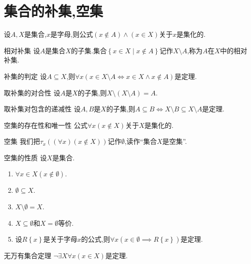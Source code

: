 \section{集合的补集,空集}

\begin{lemma}{}{}
	设$A,X$是集合,$x$是字母,则公式$\left(x\notin A\right)\wedge\left(x\in X\right)$关于$x$是集化的.
\end{lemma}

\begin{definition}{相对补集}{}
	设$A$是集合$X$的子集.集合$\left\{x\in X\middle|x\notin A\right\}$记作$X\setminus A$,称为$A$在$X$中的相对补集.
\end{definition}

\begin{proposition}{补集的判定}{}
	设$A\subseteq X$,则$\forall x\left(x\in X\setminus A\iff x\in X\wedge x\notin A\right)$是定理.
\end{proposition}

\begin{proposition}{取补集的对合性}{}
	设$A$是$X$的子集,则$X\setminus\left(X\setminus A\right)=A$.
\end{proposition}

\begin{proposition}{取补集对包含的递减性}{}
	设$A,B$是$X$的子集,则$A\subseteq B\iff X\setminus B\subseteq X\setminus A$是定理.
\end{proposition}

\begin{theorem}{空集的存在性和唯一性}{}
	公式$\forall x\left(x\notin X\right)$关于$X$是集化的.
\end{theorem}

\begin{definition}{空集}{}
	我们把$\tau_{x}\left(\left(\forall x\right)\left(x\notin X\right)\right)$记作$\emptyset$,读作``集合$X$是空集''.
\end{definition}

\begin{theorem}{空集的性质}{}
	设$X$是集合.
	\begin{enumerate}
		\item $\forall x\in X\left(x\notin\emptyset\right)$.
		\item $\emptyset\subseteq X$.
		\item $X\setminus\emptyset=X$.
		\item $X\subseteq\emptyset$和$X=\emptyset$等价.
		\item 设$R\left\{x\right\}$是关于字母$x$的公式,则$\forall x\left(x\in\emptyset\implies R\left\{x\right\}\right)$是定理.
	\end{enumerate}
\end{theorem}

\begin{theorem}{无万有集合定理}{}
	$\neg\exists X\forall x\left(x\in X\right)$是定理.
\end{theorem}
